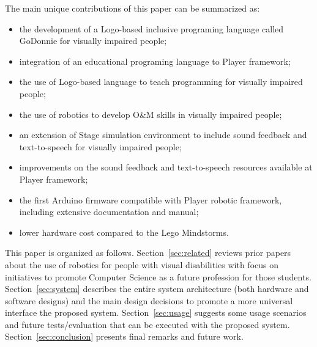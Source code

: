 The main unique contributions of this paper can be summarized as:
\begin{itemize}
\item the development of a Logo-based inclusive programing language called GoDonnie for visually impaired people;
\item integration of an educational programing language to Player framework;
\item the use of Logo-based language to teach programming for visually impaired people;
\item the use of robotics to develop O\&M skills in visually impaired people;
\item an extension of Stage simulation environment to include sound feedback and text-to-speech for visually impaired people;
\item improvements on the sound feedback and text-to-speech resources available at Player framework;
\item the first Arduino firmware compatible with Player robotic framework, including extensive documentation and manual;
\item lower hardware cost compared to the Lego Mindstorms.
\end{itemize}

This paper is organized as follows.  Section~\ref{sec:related} reviews prior papers about the use of robotics for people with visual disabilities with focus on initiatives to promote Computer Science as a future profession for those students. Section~\ref{sec:system} describes the entire system architecture (both hardware and software designs) and the main design decisions to promote a more universal interface the proposed system. Section~\ref{sec:usage} suggests some usage scenarios and future tests/evaluation that can be executed with the proposed system. Section~\ref{sec:conclusion} presents final remarks and future work.